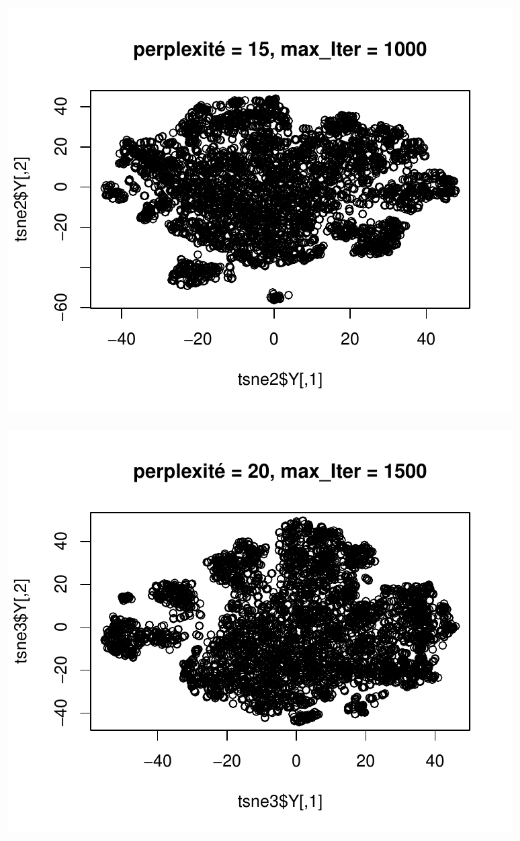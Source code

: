 \documentclass[]{imsart}
\numberwithin{equation}{section}
\theoremstyle{plain}
\begin{document}
\begin{flushleft}\includegraphics{Analyse_Exploratoire_Projet_files/figure-latex/unnamed-chunk-20-2} \end{flushleft}

\begin{flushleft}\includegraphics{Analyse_Exploratoire_Projet_files/figure-latex/unnamed-chunk-20-3} \end{flushleft}
\end{document}
